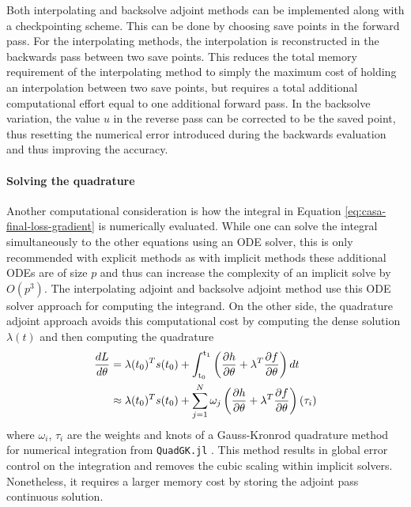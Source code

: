 Both interpolating and backsolve adjoint methods can be implemented along with a checkpointing scheme. 
This can be done by choosing save points in the forward pass. 
For the interpolating methods, the interpolation is reconstructed in the backwards pass between two save points. 
This reduces the total memory requirement of the interpolating method to simply the maximum cost of holding an interpolation between two save points, but requires a total additional computational effort equal to one additional forward pass. 
In the backsolve variation, the value $u$ in the reverse pass can be corrected to be the saved point, thus resetting the numerical error introduced during the backwards evaluation and thus improving the accuracy.

\paragraph{Solving the quadrature}

Another computational consideration is how the integral in Equation \eqref{eq:casa-final-loss-gradient} is numerically evaluated. 
While one can solve the integral simultaneously to the other equations using an ODE solver, this is only recommended with explicit methods as with implicit methods these additional ODEs are of size $p$ and thus can increase the complexity of an implicit solve by $O(p^3)$. 
The interpolating adjoint and backsolve adjoint method use this ODE solver approach for computing the integrand. 
On the other side, the quadrature adjoint approach avoids this computational cost by computing the dense solution $\lambda(t)$ and then computing the quadrature  
\begin{align}
    \frac{dL}{d\theta}
    &= 
    \lambda(t_0)^T s(t_0)
    + 
    \operatorname{\int_{t_0}^{t_1}}
    \left( \frac{\partial h}{\partial \theta} + \lambda^T \frac{\partial f}{\partial \theta} \right) dt \nonumber \\
    &\approx
    \lambda(t_0)^T s(t_0)
    + 
    \sum_{j=1}^N \omega_j \left( \frac{\partial h}{\partial \theta} + \lambda^T \frac{\partial f}{\partial \theta} \right) (\tau_i)
\end{align}
where $\omega_i$, $\tau_i$ are the weights and knots of a Gauss-Kronrod quadrature method for numerical integration from \texttt{QuadGK.jl} \cite{laurie1997calculation, gonnet2012review}. 
This method results in global error control on the integration and removes the cubic scaling within implicit solvers. Nonetheless, it requires a larger memory cost by storing the adjoint pass continuous solution.

